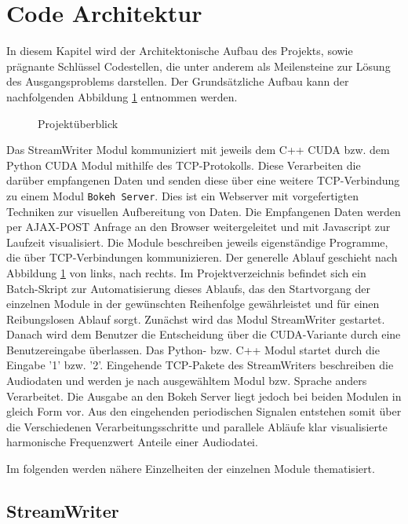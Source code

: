 
\section{Code Architektur}

In diesem Kapitel wird der Architektonische Aufbau des Projekts, sowie prägnante Schlüssel Codestellen, die unter anderem als Meilensteine zur Lösung des Ausgangsproblems darstellen. Der Grundsätzliche Aufbau kann der nachfolgenden Abbildung \ref{fig:OV} entnommen werden.

\begin{figure}[hbt!]
	\centering      
	\def\svgscale{0.75}
	
	\caption{Projektüberblick}
	\label{fig:OV}
\end{figure}

Das StreamWriter Modul kommuniziert mit jeweils dem C++ CUDA bzw. dem Python CUDA Modul mithilfe des TCP-Protokolls. Diese Verarbeiten die darüber empfangenen Daten und senden diese über eine weitere TCP-Verbindung zu einem Modul \texttt{Bokeh Server}. Dies ist ein Webserver mit vorgefertigten Techniken zur visuellen Aufbereitung von Daten. Die Empfangenen Daten werden per AJAX-POST Anfrage an den Browser weitergeleitet und mit Javascript zur Laufzeit visualisiert. Die Module beschreiben jeweils eigenständige Programme, die über TCP-Verbindungen kommunizieren. Der generelle Ablauf geschieht nach Abbildung \ref{fig:OV} von links, nach rechts. Im Projektverzeichnis befindet sich ein Batch-Skript zur Automatisierung dieses Ablaufs, das den Startvorgang der einzelnen Module in der gewünschten Reihenfolge gewährleistet und für einen Reibungslosen Ablauf sorgt. Zunächst wird das Modul StreamWriter gestartet. Danach wird dem Benutzer die Entscheidung über die CUDA-Variante durch eine Benutzereingabe überlassen. Das Python- bzw. C++ Modul startet durch die Eingabe '1' bzw. '2'. Eingehende TCP-Pakete des StreamWriters beschreiben die Audiodaten und werden je nach ausgewähltem Modul bzw. Sprache anders Verarbeitet. Die Ausgabe an den Bokeh Server liegt jedoch bei beiden Modulen in gleich Form vor. Aus den eingehenden periodischen Signalen entstehen somit über die Verschiedenen Verarbeitungsschritte und parallele Abläufe klar visualisierte harmonische Frequenzwert Anteile einer Audiodatei. 

Im folgenden werden nähere Einzelheiten der einzelnen Module thematisiert.

\subsection{StreamWriter}
\label{sub:StreamWriter}

